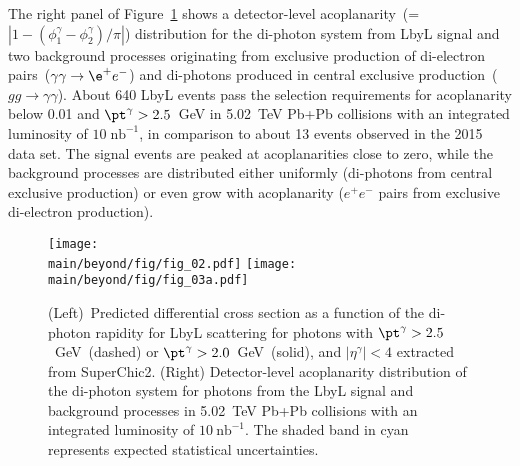 \documentclass[../report.tex]{subfiles}
\providecommand{\main}{..}
\begin{document}
The right panel of Figure~\ref{fig:lbyl} shows a detector-level  acoplanarity~(=$|1-(\phi^\gamma_1-\phi^\gamma_2)/\pi|$) distribution for the di-photon system from LbyL signal and two background processes originating from exclusive production of di-electron pairs~($\gamma\gamma\rightarrow\e^+e^-$) and di-photons produced in central exclusive production~($gg\rightarrow \gamma\gamma$). About 640 LbyL events pass the selection requirements for acoplanarity below 0.01 and $\pt^\gamma>2.5$~GeV in 5.02~TeV Pb+Pb collisions with an integrated luminosity of $10\;\mathrm{ nb}^{−1}$, in comparison to about 13 events observed in the 2015 data set. The signal events are peaked at acoplanarities close to zero, while the background processes are distributed either uniformly (di-photons from central exclusive production) or even grow with acoplanarity ($e^+e^−$ pairs from exclusive di-electron production). 

\begin{figure}[!hbt]
\centering
\texttt{[image: \\main/beyond/fig/fig\_02.pdf]}
\texttt{[image: \\main/beyond/fig/fig\_03a.pdf]}
\caption{
(Left)~Predicted differential cross section as a function of the di-photon rapidity for LbyL scattering for photons with
$\pt^\gamma>2.5$~GeV~(dashed) or $\pt^\gamma>2.0$~GeV~(solid), and
$|\eta^\gamma|<4$ extracted from SuperChic2.
(Right) Detector-level acoplanarity distribution of the di-photon system for photons from the LbyL signal and background processes in
  5.02~TeV Pb+Pb collisions with an integrated luminosity of
  $10~\mathrm{nb}^{-1}$. The shaded band in cyan represents expected statistical uncertainties.
}
\label{fig:lbyl}
\end{figure}
\end{document}
